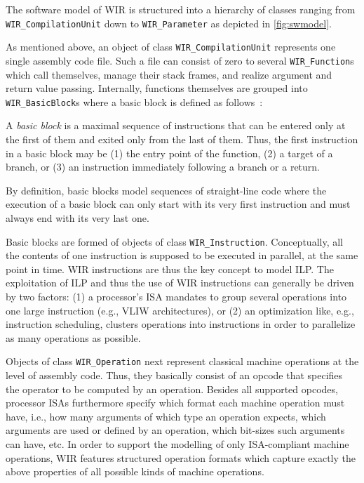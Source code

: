 The software model of \gls{WIR} is structured into a hierarchy of classes ranging from \texttt{WIR\_CompilationUnit} down to \texttt{WIR\_Parameter} as depicted in \cref{fig:swmodel}.

As mentioned above, an object of class \texttt{WIR\_CompilationUnit} represents one single assembly code file.
Such a file can consist of zero to several \texttt{WIR\_Function}s which call themselves, manage their stack frames, and realize argument and return value passing.
Internally, functions themselves are grouped into \texttt{WIR\_BasicBlock}s where a basic block is defined as follows~\cite{Much97}:

\begin{definition} \label{def:bb}
  A \emph{basic block} is a maximal sequence of instructions that can be entered only at the first of them and exited only from the last of them.
  Thus, the first instruction in a basic block may be (1) the entry point of the function, (2) a target of a branch, or (3) an instruction immediately following a branch or a return.
\end{definition}

By definition, basic blocks model sequences of straight-line code where the execution of a basic block can only start with its very first instruction and must always end with its very last one.

Basic blocks are formed of objects of class \texttt{WIR\_Instruction}.
Conceptually, all the contents of one instruction is supposed to be executed in parallel, at the same point in time.
\gls{WIR} instructions are thus the key concept to model \gls{ILP}.
The exploitation of \gls{ILP} and thus the use of \gls{WIR} instructions can generally be driven by two factors: (1) a processor's \gls{ISA} mandates to group several operations into one large instruction (e.g., \gls{VLIW} architectures), or (2) an optimization like, e.g., instruction scheduling, clusters operations into instructions in order to parallelize as many operations as possible.

Objects of class \texttt{WIR\_Operation} next represent classical machine operations at the level of assembly code.
Thus, they basically consist of an opcode that specifies the operator to be computed by an operation.
Besides all supported opcodes, processor \glspl{ISA} furthermore specify which format each machine operation must have, i.e., how many arguments of which type an operation expects, which arguments are used or defined by an operation, which bit-sizes such arguments can have, etc.
In order to support the modelling of only \gls{ISA}-compliant machine operations, \gls{WIR} features structured operation formats which capture exactly the above properties of all possible kinds of machine operations.

